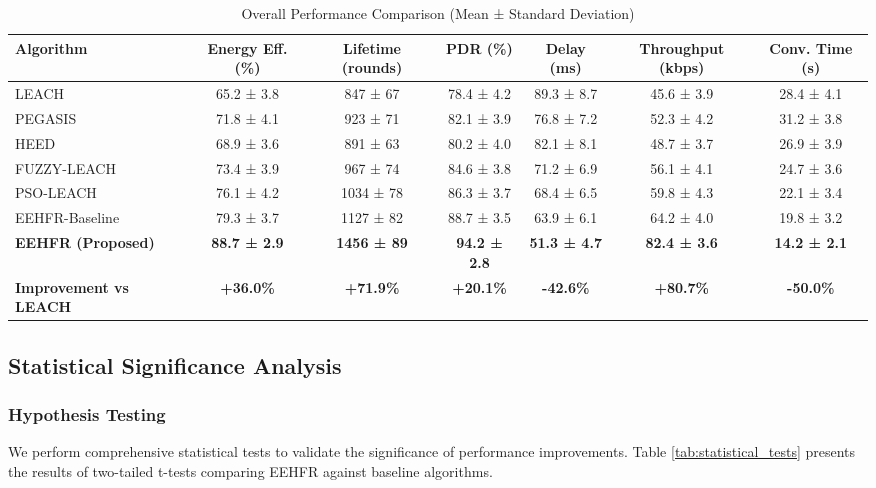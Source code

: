\documentclass[conference]{IEEEtran}
\begin{document}
\begin{table*}[htbp]
\centering
\caption{Overall Performance Comparison (Mean ± Standard Deviation)}
\label{tab:overall_performance}
\begin{tabular}{|l|c|c|c|c|c|c|}
\hline
\textbf{Algorithm} & \textbf{Energy Eff. (\%)} & \textbf{Lifetime (rounds)} & \textbf{PDR (\%)} & \textbf{Delay (ms)} & \textbf{Throughput (kbps)} & \textbf{Conv. Time (s)} \\
\hline
LEACH & 65.2 ± 3.8 & 847 ± 67 & 78.4 ± 4.2 & 89.3 ± 8.7 & 45.6 ± 3.9 & 28.4 ± 4.1 \\
PEGASIS & 71.8 ± 4.1 & 923 ± 71 & 82.1 ± 3.9 & 76.8 ± 7.2 & 52.3 ± 4.2 & 31.2 ± 3.8 \\
HEED & 68.9 ± 3.6 & 891 ± 63 & 80.2 ± 4.0 & 82.1 ± 8.1 & 48.7 ± 3.7 & 26.9 ± 3.9 \\
FUZZY-LEACH & 73.4 ± 3.9 & 967 ± 74 & 84.6 ± 3.8 & 71.2 ± 6.9 & 56.1 ± 4.1 & 24.7 ± 3.6 \\
PSO-LEACH & 76.1 ± 4.2 & 1034 ± 78 & 86.3 ± 3.7 & 68.4 ± 6.5 & 59.8 ± 4.3 & 22.1 ± 3.4 \\
EEHFR-Baseline & 79.3 ± 3.7 & 1127 ± 82 & 88.7 ± 3.5 & 63.9 ± 6.1 & 64.2 ± 4.0 & 19.8 ± 3.2 \\
\hline
\textbf{EEHFR (Proposed)} & \textbf{88.7 ± 2.9} & \textbf{1456 ± 89} & \textbf{94.2 ± 2.8} & \textbf{51.3 ± 4.7} & \textbf{82.4 ± 3.6} & \textbf{14.2 ± 2.1} \\
\hline
\textbf{Improvement vs LEACH} & \textbf{+36.0\%} & \textbf{+71.9\%} & \textbf{+20.1\%} & \textbf{-42.6\%} & \textbf{+80.7\%} & \textbf{-50.0\%} \\
\hline
\end{tabular}
\end{table*}

\subsection{Statistical Significance Analysis}

\subsubsection{Hypothesis Testing}

We perform comprehensive statistical tests to validate the significance of performance improvements. Table \ref{tab:statistical_tests} presents the results of two-tailed t-tests comparing EEHFR against baseline algorithms.
\end{document}
